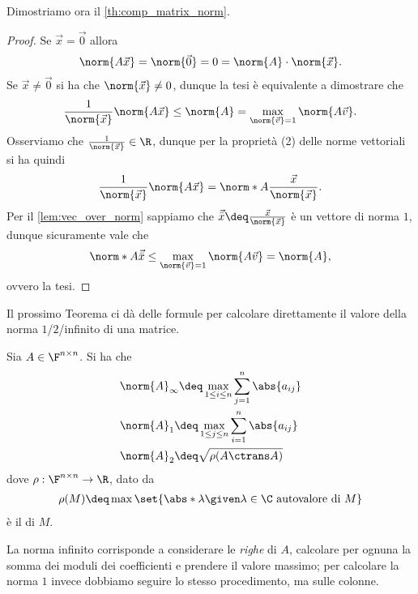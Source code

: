 Dimostriamo ora il \autoref{th:comp_matrix_norm}.
\begin{proof}
    Se $\vec x = \vec 0$ allora \[
        \norm{A\vec x} = \norm{\vec 0} = 0 = \norm{A} \cdot \norm{\vec x}.
    \] Se $\vec x \neq \vec 0$ si ha che $\norm{\vec x} \neq 0$, dunque la tesi è equivalente a dimostrare che \[
        \frac1{\norm{\vec x}} \norm{A\vec x} \leq \norm{A} = \max_{\norm{\vec v} = 1} \norm{A\vec v}.
    \] Osserviamo che $\frac1{\norm{\vec x}} \in \R$, dunque per la proprietà (2) delle norme vettoriali si ha quindi \[
        \frac1{\norm{\vec x}} \norm{A\vec x} = \norm*{A\frac{\vec x}{\norm{\vec x}}}.
    \] Per il \autoref{lem:vec_over_norm} sappiamo che $\vec{\bar x} \deq \frac{\vec x}{\norm{\vec x}}$ è un vettore di norma $1$, dunque sicuramente vale che \[
        \norm*{A\vec{\bar x}} \leq \max_{\norm{\vec v} = 1} \norm{A\vec v} = \norm{A},
    \] ovvero la tesi.
\end{proof}

Il prossimo Teorema ci dà delle formule per calcolare direttamente il valore della norma $1$/$2$/infinito di una matrice.

\begin{theorem}
    Sia $A \in \Mat{\F, n, n}$. Si ha che \begin{align*}
        &\norm{A}_\infty \deq \max_{1 \leq i \leq n} \sum_{j=1}^n \abs{a_{ij}}\\
        &\norm{A}_1 \deq \max_{1 \leq j \leq n} \sum_{i=1}^n \abs{a_{ij}}\\
        &\norm{A}_2 \deq \sqrt{\rho(A\ctrans A)}
    \end{align*} dove $\rho : \Mat{\F, n, n} \to \R$, dato da \begin{align*}
        \rho(M) \deq \max \set{\abs*{\lambda} \given \lambda \in \C \text{ autovalore di } M}
    \end{align*} è il  di $M$.
\end{theorem}

\begin{remark}
    La norma infinito corrisponde a considerare le \emph{righe} di $A$, calcolare per ognuna la somma dei moduli dei coefficienti e prendere il valore massimo; per calcolare la norma $1$ invece dobbiamo seguire lo stesso procedimento, ma sulle colonne.
\end{remark}

